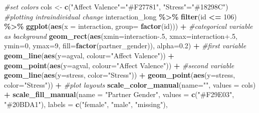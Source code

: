 \documentclass[
]{book}
\newenvironment{Shaded}{\begin{snugshade}}{\end{snugshade}}
\newcommand{\AttributeTok}[1]{\textcolor[rgb]{0.13,0.29,0.53}{#1}}
\newcommand{\CommentTok}[1]{\textcolor[rgb]{0.56,0.35,0.01}{\textit{#1}}}
\newcommand{\DecValTok}[1]{\textcolor[rgb]{0.00,0.00,0.81}{#1}}
\newcommand{\FloatTok}[1]{\textcolor[rgb]{0.00,0.00,0.81}{#1}}
\newcommand{\FunctionTok}[1]{\textcolor[rgb]{0.13,0.29,0.53}{\textbf{#1}}}
\newcommand{\NormalTok}[1]{#1}
\newcommand{\OtherTok}[1]{\textcolor[rgb]{0.56,0.35,0.01}{#1}}
\newcommand{\SpecialCharTok}[1]{\textcolor[rgb]{0.81,0.36,0.00}{\textbf{#1}}}
\newcommand{\StringTok}[1]{\textcolor[rgb]{0.31,0.60,0.02}{#1}}
\theoremstyle{definition}
\theoremstyle{definition}
\theoremstyle{definition}
\theoremstyle{definition}
\theoremstyle{remark}
\begin{document}
\begin{Shaded}
\begin{Highlighting}[]
\CommentTok{\#set colors}
\NormalTok{cols }\OtherTok{\textless{}{-}} \FunctionTok{c}\NormalTok{(}\StringTok{"Affect Valence"}\OtherTok{=}\StringTok{"\#F27781"}\NormalTok{, }\StringTok{"Stress"}\OtherTok{=}\StringTok{"\#18298C"}\NormalTok{)}
\CommentTok{\#plotting intraindividual change }
\NormalTok{interaction\_long }\SpecialCharTok{\%\textgreater{}\%}
  \FunctionTok{filter}\NormalTok{(id }\SpecialCharTok{\textless{}=} \DecValTok{106}\NormalTok{) }\SpecialCharTok{\%\textgreater{}\%}
  \FunctionTok{ggplot}\NormalTok{(}\FunctionTok{aes}\NormalTok{(}\AttributeTok{x =}\NormalTok{ interaction, }\AttributeTok{group=} \FunctionTok{factor}\NormalTok{(id))) }\SpecialCharTok{+}
  \CommentTok{\#categorical variable as background}
  \FunctionTok{geom\_rect}\NormalTok{(}\FunctionTok{aes}\NormalTok{(}\AttributeTok{xmin=}\NormalTok{interaction}\FloatTok{{-}.5}\NormalTok{, }\AttributeTok{xmax=}\NormalTok{interaction}\FloatTok{+.5}\NormalTok{, }\AttributeTok{ymin=}\DecValTok{0}\NormalTok{, }\AttributeTok{ymax=}\DecValTok{9}\NormalTok{,}
                \AttributeTok{fill=}\FunctionTok{factor}\NormalTok{(partner\_gender)), }\AttributeTok{alpha=}\FloatTok{0.2}\NormalTok{) }\SpecialCharTok{+}
  \CommentTok{\#first variable}
  \FunctionTok{geom\_line}\NormalTok{(}\FunctionTok{aes}\NormalTok{(}\AttributeTok{y=}\NormalTok{agval, }\AttributeTok{colour=}\StringTok{"Affect Valence"}\NormalTok{)) }\SpecialCharTok{+}
  \FunctionTok{geom\_point}\NormalTok{(}\FunctionTok{aes}\NormalTok{(}\AttributeTok{y=}\NormalTok{agval, }\AttributeTok{colour=}\StringTok{"Affect Valence"}\NormalTok{)) }\SpecialCharTok{+}
  \CommentTok{\#second variable}
  \FunctionTok{geom\_line}\NormalTok{(}\FunctionTok{aes}\NormalTok{(}\AttributeTok{y=}\NormalTok{stress, }\AttributeTok{color=}\StringTok{"Stress"}\NormalTok{)) }\SpecialCharTok{+}
  \FunctionTok{geom\_point}\NormalTok{(}\FunctionTok{aes}\NormalTok{(}\AttributeTok{y=}\NormalTok{stress, }\AttributeTok{color=}\StringTok{"Stress"}\NormalTok{)) }\SpecialCharTok{+}
  \CommentTok{\#plot layouts}
  \FunctionTok{scale\_color\_manual}\NormalTok{(}\AttributeTok{name=}\StringTok{""}\NormalTok{, }\AttributeTok{values =}\NormalTok{ cols) }\SpecialCharTok{+}
  \FunctionTok{scale\_fill\_manual}\NormalTok{(}\AttributeTok{name =} \StringTok{"Partner Gender"}\NormalTok{,}
                    \AttributeTok{values =} \FunctionTok{c}\NormalTok{(}\StringTok{"\#F29E03"}\NormalTok{, }\StringTok{"\#20BDA1"}\NormalTok{), }
                    \AttributeTok{labels =} \FunctionTok{c}\NormalTok{(}\StringTok{"female"}\NormalTok{, }\StringTok{"male"}\NormalTok{, }\StringTok{"missing"}\NormalTok{),}

\end{Highlighting}
\end{Shaded}
\end{document}
